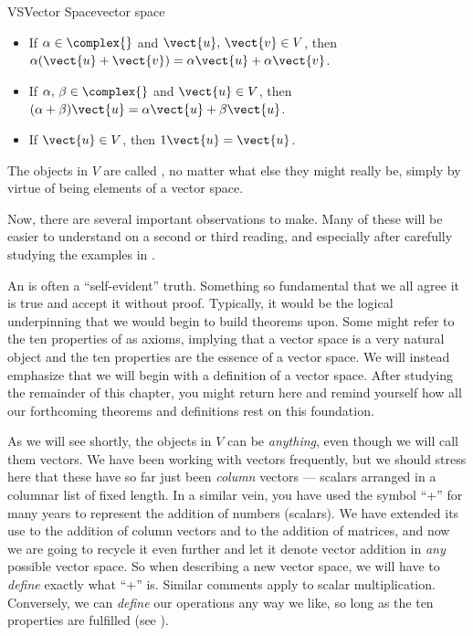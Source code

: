 \begin{definition}{VS}{Vector Space}{vector space}
\begin{itemize}
%
\item{}
If $\alpha\in\complex{\null}$ and $\vect{u},\,\vect{v}\in V$, then $\alpha(\vect{u}+\vect{v})=\alpha\vect{u}+\alpha\vect{v}$.
%
\item{}
If $\alpha,\,\beta\in\complex{\null}$ and $\vect{u}\in V$, then 
$(\alpha+\beta)\vect{u}=\alpha\vect{u}+\beta\vect{u}$.
%
\item{}
If $\vect{u}\in V$, then $1\vect{u}=\vect{u}$.
%
\end{itemize}
%
The objects in $V$ are called , no matter what else they might really be, simply by virtue of being elements of a vector space.
\end{definition}
%
Now, there are several important observations to make.  Many of these will be easier to understand on a second or third reading, and especially after carefully studying the examples in .\par
%
An  is often a ``self-evident'' truth.  Something so fundamental that we all agree it is true and accept it without proof.  Typically, it would be the logical underpinning that we would begin to build theorems upon.  Some might refer to the ten properties of  as axioms, implying that a vector space is a very natural object and the ten properties are the essence of a vector space.  We will instead emphasize that we will begin with a definition of a vector space.   After studying the remainder of this chapter, you might return here and remind yourself how all our forthcoming theorems and definitions rest on this foundation.\par
%
As we will see shortly, the objects in $V$ can be {\em anything}, even though we will call them vectors.  We have been working with vectors frequently, but we should stress here that these have so far just been {\em column} vectors --- scalars arranged in a columnar list of fixed length.  In a similar vein, you have used the symbol ``+'' for many years to represent the addition of numbers (scalars).  We have extended its use to the addition of column vectors and to the addition of matrices, and now we are going to recycle it even further and let it denote vector addition in {\em any} possible vector space.  So when describing a new vector space, we will have to {\em define} exactly what ``+'' is.  Similar comments apply to scalar multiplication.  Conversely, we can {\em define} our operations any way we like, so long as the ten properties are fulfilled (see ).\par
